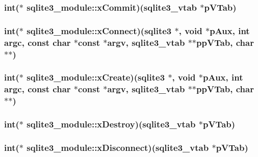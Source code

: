 \hypertarget{structsqlite3__module_a465df78231717713e98677c19e60cece}{
\subsubsection[{x\-Commit}]{\setlength{\rightskip}{0pt plus 5cm}int($\ast$ sqlite3\-\_\-module\-::x\-Commit)({\bf sqlite3\-\_\-vtab} $\ast$p\-V\-Tab)}}\label{structsqlite3__module_a465df78231717713e98677c19e60cece}
\hypertarget{structsqlite3__module_acdd9ccc4a6acff230b2d579172ae32d0}{
\subsubsection[{x\-Connect}]{\setlength{\rightskip}{0pt plus 5cm}int($\ast$ sqlite3\-\_\-module\-::x\-Connect)({\bf sqlite3} $\ast$, void $\ast$p\-Aux, int argc, const char $\ast$const $\ast$argv, {\bf sqlite3\-\_\-vtab} $\ast$$\ast$pp\-V\-Tab, char $\ast$$\ast$)}}\label{structsqlite3__module_acdd9ccc4a6acff230b2d579172ae32d0}
\hypertarget{structsqlite3__module_a95e327c9d32abd731013395d9e12b8f9}{
\subsubsection[{x\-Create}]{\setlength{\rightskip}{0pt plus 5cm}int($\ast$ sqlite3\-\_\-module\-::x\-Create)({\bf sqlite3} $\ast$, void $\ast$p\-Aux, int argc, const char $\ast$const $\ast$argv, {\bf sqlite3\-\_\-vtab} $\ast$$\ast$pp\-V\-Tab, char $\ast$$\ast$)}}\label{structsqlite3__module_a95e327c9d32abd731013395d9e12b8f9}
\hypertarget{structsqlite3__module_a296dae8dadd4eb1f7d0f1187650c7aa5}{
\subsubsection[{x\-Destroy}]{\setlength{\rightskip}{0pt plus 5cm}int($\ast$ sqlite3\-\_\-module\-::x\-Destroy)({\bf sqlite3\-\_\-vtab} $\ast$p\-V\-Tab)}}\label{structsqlite3__module_a296dae8dadd4eb1f7d0f1187650c7aa5}
\hypertarget{structsqlite3__module_a5dbaa6ff075eaff25ccfddaedba06934}{
\subsubsection[{x\-Disconnect}]{\setlength{\rightskip}{0pt plus 5cm}int($\ast$ sqlite3\-\_\-module\-::x\-Disconnect)({\bf sqlite3\-\_\-vtab} $\ast$p\-V\-Tab)}}\label{structsqlite3__module_a5dbaa6ff075eaff25ccfddaedba06934}
